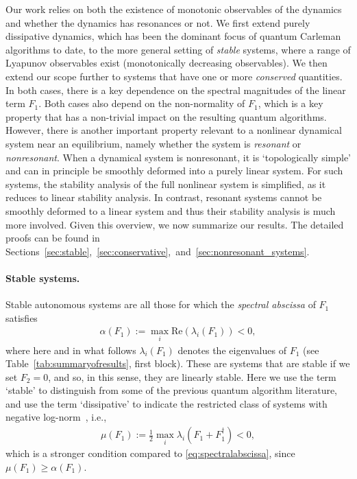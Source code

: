\documentclass[superscriptaddress,onecolumn,nofootinbib,longbibliography,a4paper,accepted=2026-09-29]{quantumarticle}
\theoremstyle{plain}
\theoremstyle{definition}
\numberwithin{thm}{section}
\numberwithin{assumption}{section}
\numberwithin{lemma}{section}
\numberwithin{prop}{section}
\numberwithin{cor}{section}
\numberwithin{definition}{section}
\numberwithin{rmk}{section}
\numberwithin{equation}{section}
\begin{document}
Our work relies on both the existence of monotonic observables of the dynamics and whether the dynamics has resonances or not. We first extend purely dissipative dynamics, which has been the dominant focus of quantum Carleman algorithms to date, to the more general setting of \emph{stable} systems, where a range of Lyapunov observables exist (monotonically decreasing observables). We then extend our scope further to systems that have one or more \emph{conserved} quantities. In both cases, there is a key dependence on the spectral magnitudes of the linear term $F_1$.  Both cases also depend on the non-normality of $F_1$, which is a key property that has a non-trivial impact on the resulting quantum algorithms. However, there is another important property relevant to a nonlinear dynamical system near an equilibrium, namely whether the system is \emph{resonant} or \emph{nonresonant}. When a dynamical system is nonresonant, it is `topologically simple' and can in principle be smoothly deformed into a purely linear system. For such systems, the stability analysis of the full nonlinear system is simplified, as it reduces to linear stability analysis. In contrast, resonant systems cannot be smoothly deformed to a linear system and thus their stability analysis is much more involved. Given this overview, we now summarize our results. The detailed proofs can be found in Sections~\ref{sec:stable},~\ref{sec:conservative},~and~\ref{sec:nonresonant_systems}. 

\paragraph{Stable systems.}

Stable autonomous systems are all those for which the \emph{spectral abscissa} of $F_1$ satisfies
\begin{align}
    \label{eq:spectralabscissa}
    \alpha(F_1) := \max_i \mathrm{Re}(\lambda_i(F_1))<0,
\end{align}
where here and in what follows $\lambda_i(F_1)$ denotes the eigenvalues of $F_1$ (see Table~\ref{tab:summaryofresults}, first block). These are systems that are stable if we set $F_2 = 0$, and so, in this sense, they are linearly stable. Here we use the term `stable' to distinguish from some of the previous quantum algorithm literature, and use the term `dissipative' to indicate the restricted class of systems with negative log-norm~\cite{costa2023further}, i.e.,
\begin{align}
\label{eq:lognorm}
    \mu(F_1):= \frac{1}{2} \max_i \lambda_i\left( F_1+ F_1^\dag \right)<0,
\end{align} 
which is a stronger condition compared to \eqref{eq:spectralabscissa}, since $\mu(F_1) \geq \alpha(F_1)$.
\end{document}
